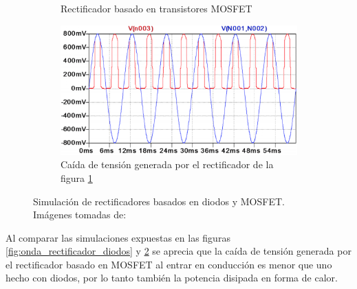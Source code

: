 \begin{figure}[h!]
\begin{subfigure}{.5\textwidth}
		\caption{Rectificador basado en transistores MOSFET}
		\label{fig:rect_MOSFET}
	\end{subfigure}
	\begin{subfigure}{.5\textwidth}
		\centering
		\includegraphics[width=.8\linewidth]{Figures/onda_passive_mosfet_rectifier}  
		\caption{Caída de tensión generada por el rectificador de la figura \ref{fig:rect_MOSFET}}
		\label{fig:onda_rectificador_MOSFET}
	\end{subfigure}
	\caption{Simulación de rectificadores basados en diodos y MOSFET. Imágenes tomadas de: \citep{Yilmaz}}
	\label{fig:comparacion_diodos_vs_MOSFET}
\end{figure}
Al comparar las simulaciones expuestas en las figuras \ref{fig:onda_rectificador_diodos} y \ref{fig:onda_rectificador_MOSFET} se aprecia que la caída de tensión generada por el rectificador basado en MOSFET al entrar en conducción es menor que uno hecho con diodos, por lo tanto también la potencia disipada en forma de calor.\\

